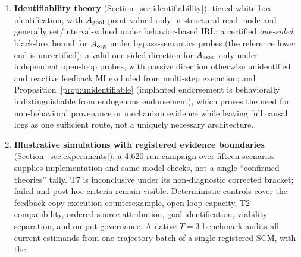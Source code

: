 \begin{enumerate}
single channel detects all registered intervention classes, but no exactly-five
minimality is claimed); manipulation comparisons under explicit
relative-baseline strictness premises and a positive baseline, while covert
manipulation can inflate a measurable hallucination index (T3);
highest-leverage attack concentration and water-filling defense under
log-linear damage (T4);
zero-factor bookkeeping (T5); an explicit autonomy margin
$\deltastar=\min(\theta/W,\kappa,\lceil(r{+}1)/2\rceil c_0/W)$ with a
positive retention floor
$\Amin$---including an iid Gaussian mean-shift lower bound showing that
expected drift damage at detection diverges as $\alpha\downarrow0$ at fixed
nonzero drift, with no universal fixed-$\alpha$ weak-drift claim---and a
certificate-failure band under the registered upper comparison model, with
capture reported separately for ATK-6's exact saturating implementation (T6);
component-level delegation laws with a two-error bracket (T7); and
coercion consistency for direct goal implantation and action compression
(T8).
\item \textbf{Identifiability theory} (Section~\ref{sec:identifiability}):
tiered white-box identification, with $A_{\mathrm{goal}}$ point-valued only in
structural-read mode and generally set/interval-valued under behavior-based
IRL; a certified \emph{one-sided} black-box bound for $A_{\mathrm{org}}$ under
bypass-semantics probes (the reference lower end is uncertified); a valid
one-sided direction for $A_{\mathrm{exec}}$ only under independent open-loop probes, with
passive direction otherwise unidentified and reactive feedback MI excluded
from multi-step execution; and Proposition~\ref{prop:unidentifiable}
(implanted endorsement is behaviorally indistinguishable from endogenous
endorsement), which proves the need for non-behavioral provenance or
mechanism evidence while leaving full causal logs as one sufficient route,
not a uniquely necessary architecture.
\item \textbf{Illustrative simulations with registered evidence boundaries}
(Section~\ref{sec:experiments}): a 4{,}620-run campaign over fifteen
scenarios supplies implementation and same-model checks, not a single
``confirmed theories'' tally. T7 is inconclusive under its non-diagnostic
corrected bracket; failed and post hoc criteria remain visible. Deterministic
controls cover the feedback-copy execution counterexample, open-loop capacity,
T2 compatibility, ordered source attribution, goal identification, viability
separation, and output governance. A native $T=3$ benchmark audits all current
estimands from one trajectory batch of a single registered SCM, with the

\end{enumerate}
